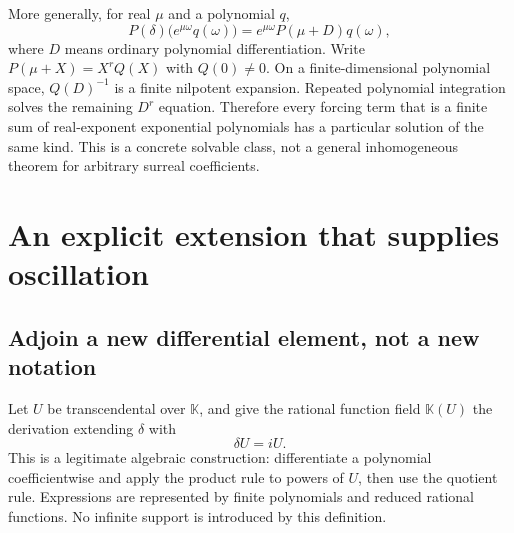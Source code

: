 \documentclass[11pt,letterpaper]{article}
\numberwithin{equation}{section}
\theoremstyle{definition}
\theoremstyle{remark}
\newcommand{\K}{\mathbb K}
\begin{document}
More generally, for real $\mu$ and a polynomial $q$,
\[
 P(\delta)\bigl(e^{\mu\omega}q(\omega)\bigr)
 =e^{\mu\omega}P(\mu+D)q(\omega),
\]
where $D$ means ordinary polynomial differentiation. Write $P(\mu+X)=X^rQ(X)$ with $Q(0)\ne0$. On a finite-dimensional polynomial space, $Q(D)^{-1}$ is a finite nilpotent expansion. Repeated polynomial integration solves the remaining $D^r$ equation. Therefore every forcing term that is a finite sum of real-exponent exponential polynomials has a particular solution of the same kind. This is a concrete solvable class, not a general inhomogeneous theorem for arbitrary surreal coefficients.

\section{An explicit extension that supplies oscillation}\label{sec:extension}

\subsection{Adjoin a new differential element, not a new notation}
Let $U$ be transcendental over $\K$, and give the rational function field $\K(U)$ the derivation extending $\delta$ with
\begin{equation}\label{eq:U}
 \delta U=iU.
\end{equation}
This is a legitimate algebraic construction: differentiate a polynomial coefficientwise and apply the product rule to powers of $U$, then use the quotient rule. Expressions are represented by finite polynomials and reduced rational functions. No infinite support is introduced by this definition.
\end{document}
